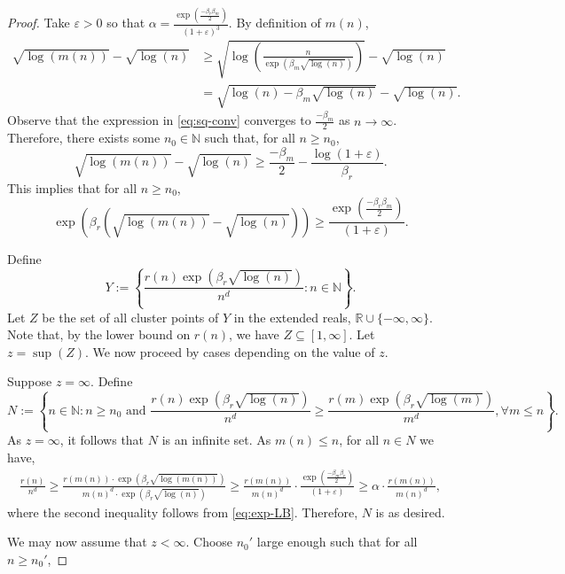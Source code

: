 \documentclass[12pt]{article}
\numberwithin{equation}{section}
\newcommand{\N}{\mathbb{N}}
\newcommand{\R}{\mathbb{R}}
\theoremstyle{definition}
\theoremstyle{remark}
\begin{document}
\begin{proof}
Take $\varepsilon>0$ so that $\alpha = \frac{\exp\left(\frac{-\beta_r\beta_m}{2}\right)}{(1+\varepsilon)^{3}}$. By definition of $m(n)$, 
\begin{align}
\sqrt{\log(m(n))} - \sqrt{\log(n)} &\geq \sqrt{\log\left(\frac{n}{\exp(\beta_m\sqrt{\log(n)})}\right)} - \sqrt{\log(n)}\nonumber \\
&= \sqrt{\log(n) - \beta_m\sqrt{\log(n)}} - \sqrt{\log(n)}. \label{eq:sq-conv}
\end{align}
Observe that the expression in \eqref{eq:sq-conv} converges to $\frac{-\beta_m}{2}$ as $n \to \infty$. Therefore, there exists some $n_0 \in \N$ such that, for all $n \geq n_0$, \[\sqrt{\log(m(n))} - \sqrt{\log(n)} \geq \frac{-\beta_m}{2} - \frac{\log(1+\varepsilon)}{\beta_r}. \] 
This implies that for all $n \geq n_0$, \begin{equation}\label{eq:exp-LB}
\exp{\left(\beta_r\left(\sqrt{\log(m(n))} - \sqrt{\log(n)}\right)\right)} \geq \frac{\exp{(\frac{-\beta_r\beta_m}{2})}}{(1+\varepsilon)}. 
\end{equation}

Define 
\[Y:= \left\{ \frac{r(n) \exp(\beta_r \sqrt{\log(n)})}{n^d}: n \in \N \right\}. \] Let $Z$ be the set of all cluster points of $Y$ in the extended reals, $\R \cup \{-\infty, \infty\}$. Note that, by the lower bound on $r(n)$, we have $Z \subseteq [1, \infty]$. Let $z = \sup(Z)$. We now proceed by cases depending on the value of $z$. 

Suppose $z = \infty$. Define \[N := \left\{n \in \N: n \geq n_0 \text{ and } \frac{r(n)\exp(\beta_r\sqrt{\log(n)})}{n^d} \geq \frac{r(m)\exp(\beta_r\sqrt{\log(m)})}{m^d}, \forall m \leq n \right\}. \]
As $z = \infty$, it follows that $N$ is an infinite set. As $m(n) \leq n$, for all $n \in N$ we have, 
\begin{align*}
\frac{r(n)}{n^d} \geq \frac{r(m(n))\cdot\exp(\beta_r\sqrt{\log(m(n))})}{m(n)^d \cdot\exp(\beta_r\sqrt{\log(n)})} \geq \frac{r(m(n))}{m(n)^d}\cdot\frac{\exp(\frac{-\beta_m\beta_r}{2})}{(1+\varepsilon)} \geq \alpha \cdot \frac{r(m(n))}{m(n)^d},
\end{align*}
where the second inequality follows from \eqref{eq:exp-LB}. Therefore, $N$ is as desired. 

We may now assume that $z < \infty$. Choose $n_0'$ large enough such that for all $n \geq n_0'$, 


\end{proof}
\end{document}
